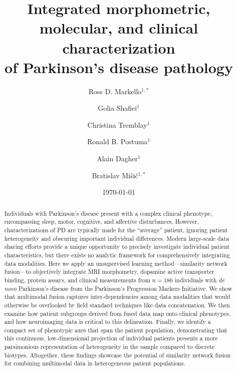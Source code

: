 \documentclass[12pt,aps,pra,reprint,showkeys]{revtex4-1}
\begin{document}
\title{\texorpdfstring{Integrated morphometric, molecular, and clinical characterization\\ of Parkinson's disease pathology}{}}
\author{Ross D. Markello$^{1,*}$}
\author{Golia Shafiei$^{1}$}
\author{Christina Tremblay$^{1}$}
\author{Ronald B. Postuma$^{1}$}
\author{Alain Dagher$^{1}$}
\author{Bratislav Mi\^{s}i\'{c}$^{1,*}$}


\date{\today}

\begin{abstract}
\noindent Individuals with Parkinson's disease present with a complex clinical phenotype, encompassing sleep, motor, cognitive, and affective disturbances.
However, characterizations of PD are typically made for the ``average'' patient, ignoring patient heterogeneity and obscuring important individual differences.
Modern large-scale data sharing efforts provide a unique opportunity to precisely investigate individual patient characteristics, but there exists no analytic framework for comprehensively integrating data modalities.
Here we apply an unsupervised learning method---similarity network fusion---to objectively integrate MRI morphometry, dopamine active transporter binding, protein assays, and clinical measurements from $n = 186$ individuals with \emph{de novo} Parkinson's disease from the Parkinson's Progression Markers Initiative.
We show that multimodal fusion captures inter-dependencies among data modalities that would otherwise be overlooked by field standard techniques like data concatenation.
We then examine how patient subgroups derived from fused data map onto clinical phenotypes, and how neuroimaging data is critical to this delineation.
Finally, we identify a compact set of phenotypic axes that span the patient population, demonstrating that this continuous, low-dimensional projection of individual patients presents a more parsimonious representation of heterogeneity in the sample compared to discrete biotypes.
Altogether, these findings showcase the potential of similarity network fusion for combining multimodal data in heterogeneous patient populations.
\end{abstract}

\end{document}
